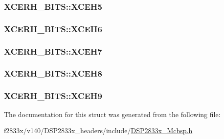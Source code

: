 \subsubsection[{X\+C\+E\+H5}]{ X\+C\+E\+R\+H\+\_\+\+B\+I\+T\+S\+::\+X\+C\+E\+H5}\label{struct_x_c_e_r_h___b_i_t_s_adc58c9decb6bb289603a70e4c91ce922}
\hypertarget{struct_x_c_e_r_h___b_i_t_s_a95d68c48d6bb8d6f0c75c4674bef29f9}{}
\subsubsection[{X\+C\+E\+H6}]{ X\+C\+E\+R\+H\+\_\+\+B\+I\+T\+S\+::\+X\+C\+E\+H6}\label{struct_x_c_e_r_h___b_i_t_s_a95d68c48d6bb8d6f0c75c4674bef29f9}
\hypertarget{struct_x_c_e_r_h___b_i_t_s_a42b09cb7e154e45e86fb6e624ce94277}{}
\subsubsection[{X\+C\+E\+H7}]{ X\+C\+E\+R\+H\+\_\+\+B\+I\+T\+S\+::\+X\+C\+E\+H7}\label{struct_x_c_e_r_h___b_i_t_s_a42b09cb7e154e45e86fb6e624ce94277}
\hypertarget{struct_x_c_e_r_h___b_i_t_s_aef3ba0fe4adb2869aee72322c3dc99ef}{}
\subsubsection[{X\+C\+E\+H8}]{ X\+C\+E\+R\+H\+\_\+\+B\+I\+T\+S\+::\+X\+C\+E\+H8}\label{struct_x_c_e_r_h___b_i_t_s_aef3ba0fe4adb2869aee72322c3dc99ef}
\hypertarget{struct_x_c_e_r_h___b_i_t_s_a8bf3287bed117b69825a1e66b3a51b60}{}
\subsubsection[{X\+C\+E\+H9}]{ X\+C\+E\+R\+H\+\_\+\+B\+I\+T\+S\+::\+X\+C\+E\+H9}\label{struct_x_c_e_r_h___b_i_t_s_a8bf3287bed117b69825a1e66b3a51b60}


The documentation for this struct was generated from the following file\+:\begin{DoxyCompactItemize}
\item 
f2833x/v140/\+D\+S\+P2833x\+\_\+headers/include/\hyperlink{_d_s_p2833x___mcbsp_8h}{D\+S\+P2833x\+\_\+\+Mcbsp.\+h}\end{DoxyCompactItemize}
